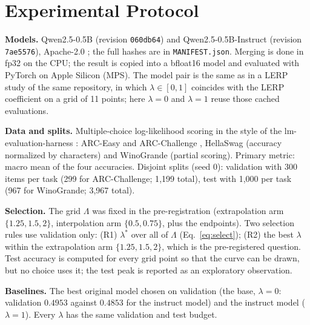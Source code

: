 \documentclass[conference]{IEEEtran}
\begin{document}
\section{Experimental Protocol}
\textbf{Models.} Qwen2.5-0.5B (revision \texttt{060db64}) and Qwen2.5-0.5B-Instruct (revision \texttt{7ae5576}), Apache-2.0 \cite{qwen25}; the full hashes are in \texttt{MANIFEST.json}. Merging is done in fp32 on the CPU; the result is copied into a bfloat16 model and evaluated with PyTorch on Apple Silicon (MPS). The model pair is the same as in a LERP study of the same repository, in which $\lambda\in[0,1]$ coincides with the LERP coefficient on a grid of 11 points; here $\lambda=0$ and $\lambda=1$ reuse those cached evaluations.

\textbf{Data and splits.} Multiple-choice log-likelihood scoring in the style of the lm-evaluation-harness \cite{gao2021harness}: ARC-Easy and ARC-Challenge \cite{clark2018arc}, HellaSwag \cite{zellers2019hellaswag} (accuracy normalized by characters) and WinoGrande \cite{sakaguchi2019winogrande} (partial scoring). Primary metric: macro mean of the four accuracies. Disjoint splits (seed 0): validation with 300 items per task (299 for ARC-Challenge; 1{,}199 total), test with 1{,}000 per task (967 for WinoGrande; 3{,}967 total).

\textbf{Selection.} The grid $\Lambda$ was fixed in the pre-registration (extrapolation arm $\{1.25,1.5,2\}$, interpolation arm $\{0.5,0.75\}$, plus the endpoints). Two selection rules use validation only: (R1) $\lambda^\ast$ over all of $\Lambda$ (Eq.~\ref{eq:select}); (R2) the best $\lambda$ within the extrapolation arm $\{1.25,1.5,2\}$, which is the pre-registered question. Test accuracy is computed for every grid point so that the curve can be drawn, but no choice uses it; the test peak is reported as an exploratory observation.

\textbf{Baselines.} The best original model chosen on validation (the base, $\lambda=0$: validation $0.4953$ against $0.4853$ for the instruct model) and the instruct model ($\lambda=1$). Every $\lambda$ has the same validation and test budget.
\end{document}
